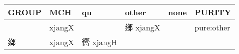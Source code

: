\documentclass[14pt,a4paper]{scrartcl}
\begin{document}
\begin{longtable}[c]{@{}llllll@{}}
\toprule
\begin{minipage}[b]{0.14\columnwidth}\raggedright\strut
GROUP
\strut\end{minipage} &
\begin{minipage}[b]{0.14\columnwidth}\raggedright\strut
MCH
\strut\end{minipage} &
\begin{minipage}[b]{0.14\columnwidth}\raggedright\strut
qu
\strut\end{minipage} &
\begin{minipage}[b]{0.14\columnwidth}\raggedright\strut
other
\strut\end{minipage} &
\begin{minipage}[b]{0.14\columnwidth}\raggedright\strut
none
\strut\end{minipage} &
\begin{minipage}[b]{0.14\columnwidth}\raggedright\strut
PURITY
\strut\end{minipage}\tabularnewline
\midrule
\endhead
\begin{minipage}[t]{0.14\columnwidth}\raggedright\strut
𨞰
\strut\end{minipage} &
\begin{minipage}[t]{0.14\columnwidth}\raggedright\strut
xjangX
\strut\end{minipage} &
\begin{minipage}[t]{0.14\columnwidth}\raggedright\strut
\strut\end{minipage} &
\begin{minipage}[t]{0.14\columnwidth}\raggedright\strut
鄉 xjangX
\strut\end{minipage} &
\begin{minipage}[t]{0.14\columnwidth}\raggedright\strut
\strut\end{minipage} &
\begin{minipage}[t]{0.14\columnwidth}\raggedright\strut
pure:other
\strut\end{minipage}\tabularnewline
\begin{minipage}[t]{0.14\columnwidth}\raggedright\strut
鄕
\strut\end{minipage} &
\begin{minipage}[t]{0.14\columnwidth}\raggedright\strut
xjangX
\strut\end{minipage} &
\begin{minipage}[t]{0.14\columnwidth}\raggedright\strut
嚮 xjangH
\strut\end{minipage} &
\begin{minipage}[t]{0.14\columnwidth}\raggedright\strut

\end{minipage}
\end{longtable}
\end{document}
